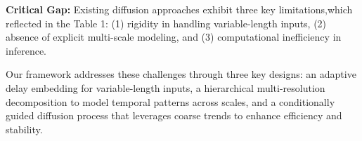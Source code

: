 

\vspace{-15pt}


\textbf{Critical Gap:} Existing diffusion approaches exhibit three key limitations,which reflected in the Table 1: 
(1) rigidity in handling variable-length inputs, 
(2) absence of explicit multi-scale modeling, and 
(3) computational inefficiency in inference. 

Our framework addresses these challenges through three key designs: an adaptive delay embedding for variable-length inputs, a hierarchical multi-resolution decomposition to model temporal patterns across scales, and a conditionally guided diffusion process that leverages coarse trends to enhance efficiency and stability.










